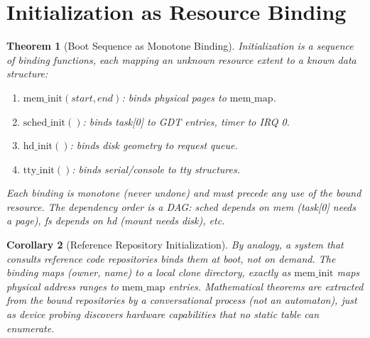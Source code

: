 \documentclass[11pt]{article}
\newtheorem{theorem}{Theorem}[section]
\newtheorem{corollary}[theorem]{Corollary}
\begin{document}
\section{Initialization as Resource Binding}

\begin{theorem}[Boot Sequence as Monotone Binding]
Initialization is a sequence of binding functions,
each mapping an unknown resource extent to a known data structure:
\begin{enumerate}
\item $\text{mem\_init}(start, end)$: binds physical pages to $\text{mem\_map}$.
\item $\text{sched\_init}()$: binds task[0] to GDT entries, timer to IRQ 0.
\item $\text{hd\_init}()$: binds disk geometry to request queue.
\item $\text{tty\_init}()$: binds serial/console to tty structures.
\end{enumerate}
Each binding is monotone (never undone) and must precede any use
of the bound resource. The dependency order is a DAG:
sched depends on mem (task[0] needs a page), fs depends on hd
(mount needs disk), etc.
\end{theorem}

\begin{corollary}[Reference Repository Initialization]
By analogy, a system that consults reference code repositories
binds them at boot, not on demand. The binding maps
(owner, name) to a local clone directory, exactly as
$\text{mem\_init}$ maps physical address ranges to $\text{mem\_map}$ entries.
Mathematical theorems are extracted from the bound repositories
by a conversational process (not an automaton), just as
device probing discovers hardware capabilities that no
static table can enumerate.
\end{corollary}
\end{document}
